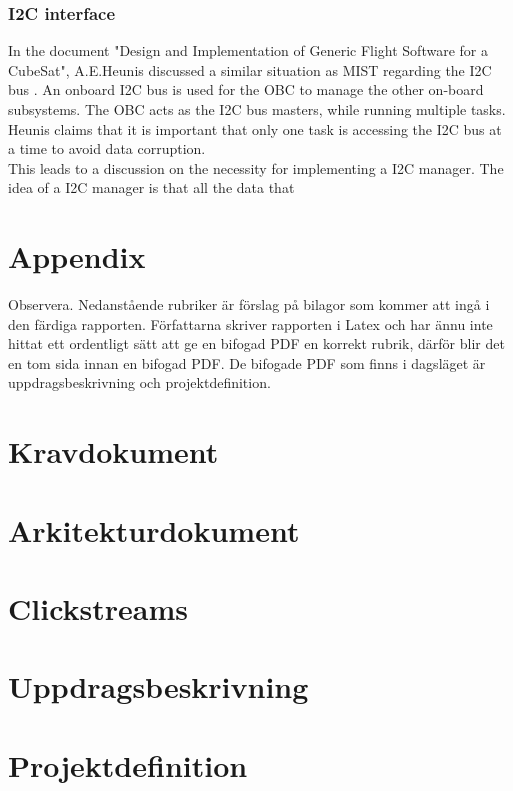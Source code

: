 \documentclass[a4paper]{article}
\begin{document}
\subsubsection{I2C interface}
In the document "Design and Implementation of Generic Flight Software for a CubeSat", A.E.Heunis discussed a similar situation as MIST regarding the I2C bus \cite{I2C}. An onboard I2C bus is used for the OBC to manage the other on-board subsystems. The OBC acts as the I2C bus masters, while running multiple tasks. Heunis claims that it is important that only one task is accessing the I2C bus at a time to avoid data corruption. \\
\indent This leads to a discussion on the necessity for implementing a I2C manager. The idea of a I2C manager is that all the data that 






\newpage





\newpage
\section{Appendix}
\begin{appendices}
Observera.
Nedanstående rubriker är förslag på bilagor som kommer att ingå i den färdiga rapporten. Författarna skriver rapporten i Latex och har ännu inte hittat ett ordentligt sätt att ge en bifogad PDF en korrekt rubrik, därför blir det en tom sida innan en bifogad PDF. De bifogade PDF som finns i dagsläget är uppdragsbeskrivning och projektdefinition.
\section{Kravdokument}
\label{appendix:kravdokument}
\section{Arkitekturdokument}
\label{appendix:arkitekturdokument}
\section{Clickstreams}
\label{appendix:clickstreams}
\section{Uppdragsbeskrivning}
\label{appendix:uppdragsbeskrivning}
%
\section{Projektdefinition}
\label{appendix:projektdef}
%
\end{appendices}
\end{document}
